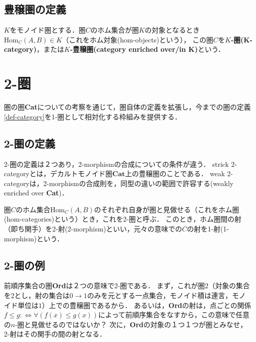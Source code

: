 \documentclass[uplatex, 12pt, dvipdfmx]{jsreport}
\begin{document}
\section{豊穣圏の定義}
\begin{definition}\rm{}
    $K$をモノイド圏とする．圏$C$のホム集合が圏$K$の対象となるとき$\mathrm{Hom}_C(A,B)\in K$（これをホム対象(hom-objects)という），
    この圏$C$を\textbf{$K$-圏(K-category)}，または\textbf{$K$-豊穣圏(category enriched over/in K)}という．
\end{definition}

\chapter{2-圏}
圏の圏\textbf{Cat}についての考察を通じて，圏自体の定義を拡張し，今までの圏の定義\ref{def-category}を1-圏として相対化する枠組みを提供する．

\section{2-圏の定義}
2-圏の定義は２つあり，2-morphismの合成についての条件が違う．
strick 2-categoryとは，デカルトモノイド圏$\mathbf{Cat}$上の豊穣圏のことである．
weak 2-categoryは，2-morphismの合成則を，同型の違いの範囲で許容する(weakly enriched over \textbf{Cat})．
\begin{definition}\rm{}
    圏$C$のホム集合$\mathrm{Hom}_C(A,B)$のそれぞれ自身が圏と見做せる（これをホム圏(hom-categories)という）とき，これを2-圏と呼ぶ．
    このとき，ホム圏間の射（即ち関手）を2-射(2-morphism)といい，元々の意味での$C$の射を1-射(1-morphism)という．
\end{definition}

\begin{definition}
    
\end{definition}

\section{2-圏の例}

前順序集合の圏\textbf{Ord}は２つの意味で2-圏である．
まず，これが圏$2$（対象の集合を$2$とし，射の集合は$0\to 1$のみを元とする一点集合，モノイド積は連言，モノイド単位は$1$）上での豊穣圏であるから．
あるいは，\textbf{Ord}の射は，点ごとの関係$f\le g:\Longleftrightarrow \forall (f(x)\le g(x))$によって前順序集合をなすから，この意味で任意の$n$-圏と見做せるのではないか？
次に，\textbf{Ord}の対象の１つ１つが圏とみなせ，2-射はその関手の間の射となる．
\end{document}
